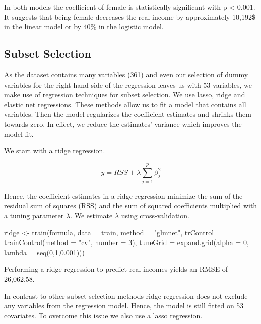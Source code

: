 \documentclass[11pt,a4paper]{article}
\newenvironment{Shaded}{\begin{snugshade}}{\end{snugshade}}
\newcommand{\AttributeTok}[1]{\textcolor[rgb]{0.77,0.63,0.00}{#1}}
\newcommand{\DecValTok}[1]{\textcolor[rgb]{0.00,0.00,0.81}{#1}}
\newcommand{\FloatTok}[1]{\textcolor[rgb]{0.00,0.00,0.81}{#1}}
\newcommand{\FunctionTok}[1]{\textcolor[rgb]{0.00,0.00,0.00}{#1}}
\newcommand{\NormalTok}[1]{#1}
\newcommand{\OtherTok}[1]{\textcolor[rgb]{0.56,0.35,0.01}{#1}}
\newcommand{\StringTok}[1]{\textcolor[rgb]{0.31,0.60,0.02}{#1}}
\begin{document}
In both models the coefficient of female is statistically significant
with p \textless{} 0.001. It suggests that being female decreases the
real income by approximately 10,192\$ in the linear model or by 40\% in
the logistic model.

\hypertarget{subset-selection}{%
\subsection{Subset Selection}\label{subset-selection}}

As the dataset contains many variables (361) and even our selection of
dummy variables for the right-hand side of the regression leaves us with
53 variables, we make use of regression techniques for subset selection.
We use lasso, ridge and elastic net regressions. These methods allow us
to fit a model that contains all variables. Then the model regularizes
the coefficient estimates and shrinks them towards zero. In effect, we
reduce the estimates' variance which improves the model fit.

We start with a ridge regression.

\[
y = RSS + \lambda \sum^p _{j=1} \beta^2_j 
\]

Hence, the coefficient estimates in a ridge regression minimize the sum
of the residual sum of squares (RSS) and the sum of squared coefficients
multiplied with a tuning parameter \(\lambda\). We estimate \(\lambda\)
using cross-validation.

\begin{Shaded}
\begin{Highlighting}[]
\NormalTok{ridge }\OtherTok{\textless{}{-}} \FunctionTok{train}\NormalTok{(formula, }\AttributeTok{data =}\NormalTok{ train,}
  \AttributeTok{method =} \StringTok{"glmnet"}\NormalTok{, }\AttributeTok{trControl =} \FunctionTok{trainControl}\NormalTok{(}\AttributeTok{method =} \StringTok{"cv"}\NormalTok{, }\AttributeTok{number =} \DecValTok{3}\NormalTok{),}
  \AttributeTok{tuneGrid =} \FunctionTok{expand.grid}\NormalTok{(}\AttributeTok{alpha =} \DecValTok{0}\NormalTok{, }\AttributeTok{lambda =} \FunctionTok{seq}\NormalTok{(}\DecValTok{0}\NormalTok{,}\DecValTok{1}\NormalTok{,}\FloatTok{0.001}\NormalTok{)))}
\end{Highlighting}
\end{Shaded}

Performing a ridge regression to predict real incomes yields an RMSE of
26,062.58.

In contrast to other subset selection methods ridge regression does not
exclude any variables from the regression model. Hence, the model is
still fitted on 53 covariates. To overcome this issue we also use a
lasso regression.
\end{document}
